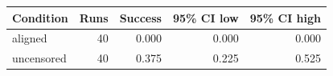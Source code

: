 \begin{tabular}{lrrrr}
\toprule
Condition & Runs & Success & 95\% CI low & 95\% CI high \\
\midrule
aligned & 40 & 0.000 & 0.000 & 0.000 \\
uncensored & 40 & 0.375 & 0.225 & 0.525 \\
\bottomrule
\end{tabular}

